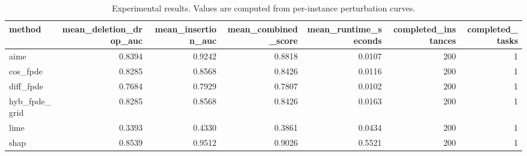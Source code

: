 \begin{table}[t]
\caption{Experimental results. Values are computed from per-instance perturbation curves.}
\label{tab:main_results_computed}
\centering
\begin{tabular}{lrrrrrr}
\toprule
method & mean\_deletion\_drop\_auc & mean\_insertion\_auc & mean\_combined\_score & mean\_runtime\_seconds & completed\_instances & completed\_tasks \\
\midrule
aime & 0.8394 & 0.9242 & 0.8818 & 0.0107 & 200 & 1 \\
cos\_fpde & 0.8285 & 0.8568 & 0.8426 & 0.0116 & 200 & 1 \\
diff\_fpde & 0.7684 & 0.7929 & 0.7807 & 0.0102 & 200 & 1 \\
hyb\_fpde\_grid & 0.8285 & 0.8568 & 0.8426 & 0.0163 & 200 & 1 \\
lime & 0.3393 & 0.4330 & 0.3861 & 0.0434 & 200 & 1 \\
shap & 0.8539 & 0.9512 & 0.9026 & 0.5521 & 200 & 1 \\
\bottomrule
\end{tabular}

\end{table}

